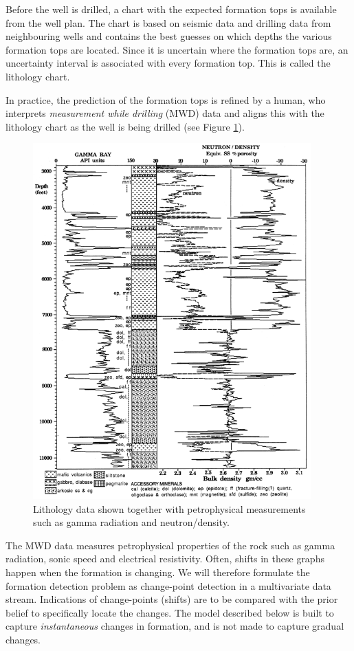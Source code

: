 Before the well is drilled, a chart with the expected formation tops is available from the well plan. The chart is based on seismic data and drilling data from neighbouring wells and contains the best guesses on which depths the various formation tops are located. Since it is uncertain where the formation tops are, an uncertainty interval is associated with every formation top. This is called the lithology chart. 

In practice, the prediction of the formation tops is refined by a human, who interprets  {\em measurement while drilling} (MWD) data and aligns this with the lithology chart as the well is being drilled (see Figure \ref{lithology}).

\begin{figure}[ht!]
\begin{center}
\includegraphics [keepaspectratio,width = 10.7cm] {figures/VT_lithologyGamma.png}
\caption{Lithology data shown together with petrophysical measurements such as gamma radiation and neutron/density.}
\label{lithology}
\end{center}
\end{figure}

The MWD data measures petrophysical properties of the rock such as gamma radiation, sonic speed and electrical resistivity. 
Often, shifts in these graphs happen when the formation is changing. We will therefore formulate the formation detection problem as change-point detection in a multivariate data stream. 
Indications of change-points (shifts) are to be compared with the prior belief to specifically locate the changes. The model described below is built to capture \textit{instantaneous} changes in formation, and is not made to capture gradual changes. 

